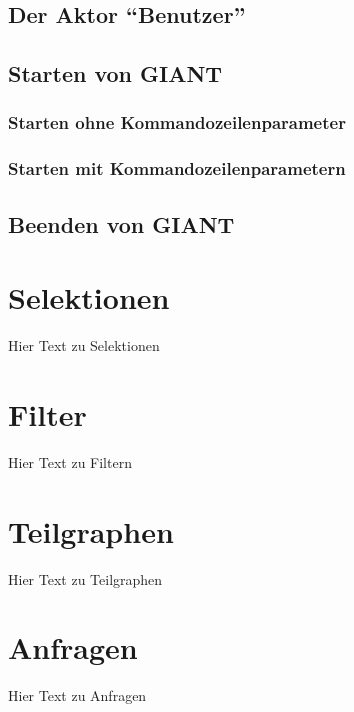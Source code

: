 %
%

\section{Der Aktor ``Benutzer''}
\section{Starten von GIANT} %
\subsection{Starten ohne Kommandozeilenparameter}
\subsection{Starten mit Kommandozeilenparametern}
\section{Beenden von GIANT}
  




\chapter{Selektionen}
Hier Text zu Selektionen


\chapter{Filter}
Hier Text zu Filtern


\chapter{Teilgraphen}
Hier Text zu Teilgraphen


\chapter{Anfragen}
Hier Text zu Anfragen

